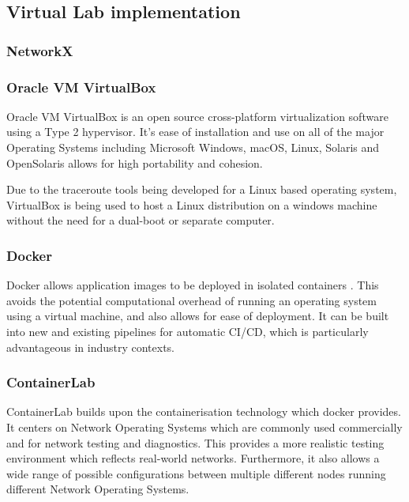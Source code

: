 \subsection{Virtual Lab implementation}

\subsubsection{NetworkX}



\subsubsection{Oracle VM VirtualBox}
Oracle VM VirtualBox is an open source cross-platform virtualization software using a Type 2 hypervisor. \cite{VirtualWare} It's ease of installation and use on all of the major Operating Systems including Microsoft Windows, macOS, Linux, Solaris and OpenSolaris \cite{oracleVM} allows for high portability and cohesion. 

Due to the traceroute tools being developed for a Linux based operating system, VirtualBox is being used to host a Linux distribution on a windows machine without the need for a dual-boot or separate computer.

\subsubsection{Docker}
Docker allows application images to be deployed in isolated containers \cite{docker_isolate}. This avoids the potential computational overhead of running an operating system using a virtual machine, and also allows for ease of deployment. It can be built into new and existing pipelines for automatic CI/CD, which is particularly advantageous in industry contexts. 

\subsubsection{ContainerLab}

ContainerLab builds upon the containerisation technology which docker provides. It centers on Network Operating Systems which are commonly used commercially and for network testing and diagnostics. This provides a more realistic testing environment which reflects real-world networks. Furthermore, it also allows a wide range of possible configurations between multiple different nodes running different Network Operating Systems.

